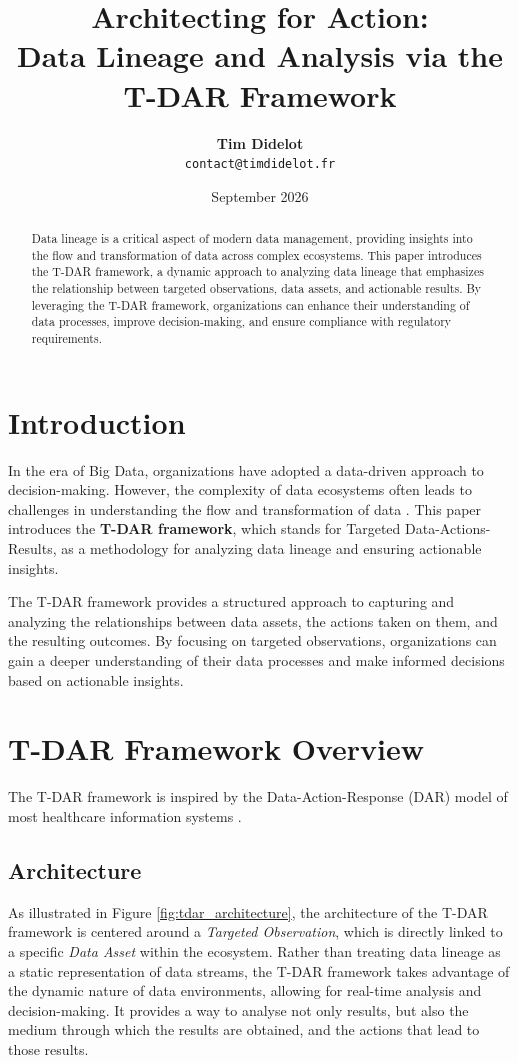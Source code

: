 \documentclass[11pt,a4paper]{article}
\title{\LARGE\textbf{Architecting for Action:} \\ \Large Data Lineage and Analysis via the T-DAR Framework}
\author{\textbf{Tim Didelot} \\ \texttt{contact@timdidelot.fr}}
\date{September 2026}
\begin{document}
\maketitle

\begin{abstract}
\noindent
Data lineage is a critical aspect of modern data management, providing insights into the flow and transformation of data across complex ecosystems. This paper introduces the T-DAR framework, a dynamic approach to analyzing data lineage that emphasizes the relationship between targeted observations, data assets, and actionable results. By leveraging the T-DAR framework, organizations can enhance their understanding of data processes, improve decision-making, and ensure compliance with regulatory requirements.
\end{abstract}

\section{Introduction}
In the era of Big Data, organizations have adopted a data-driven approach to decision-making. However, the complexity of data ecosystems often leads to challenges in understanding the flow and transformation of data \cite{syed2020}. This paper introduces the \textbf{T-DAR framework}, which stands for Targeted Data-Actions-Results, as a methodology for analyzing data lineage and ensuring actionable insights. 

The T-DAR framework provides a structured approach to capturing and analyzing the relationships between data assets, the actions taken on them, and the resulting outcomes. By focusing on targeted observations, organizations can gain a deeper understanding of their data processes and make informed decisions based on actionable insights.

\section{T-DAR Framework Overview}
The T-DAR framework is inspired by the Data-Action-Response (DAR) model of most healthcare information systems \cite{portableRN2007}.

\subsection{Architecture}
As illustrated in Figure \ref{fig:tdar_architecture}, the architecture of the T-DAR framework is centered around a \textit{Targeted Observation}, which is directly linked to a specific \textit{Data Asset} within the ecosystem. Rather than treating data lineage as a static representation of data streams, the T-DAR framework takes advantage of the dynamic nature of data environments, allowing for real-time analysis and decision-making. It provides a way to analyse not only results, but also the medium through which the results are obtained, and the actions that lead to those results.
\end{document}
